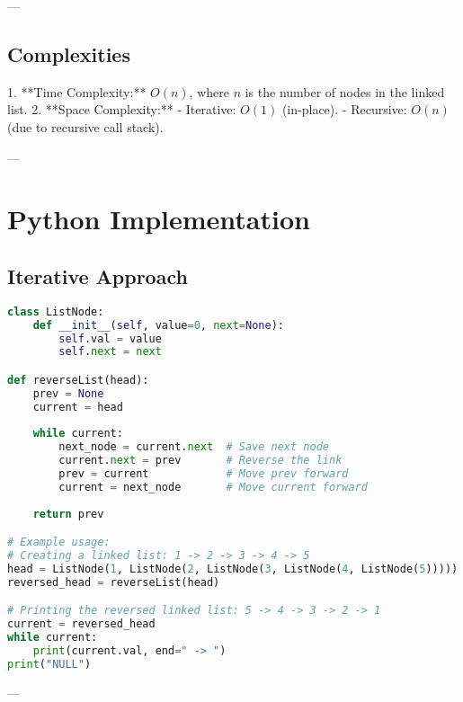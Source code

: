 ---

\subsection*{Complexities}
1. **Time Complexity:** \(O(n)\), where \(n\) is the number of nodes in the linked list.
2. **Space Complexity:**
   - Iterative: \(O(1)\) (in-place).
   - Recursive: \(O(n)\) (due to recursive call stack).

---

\section*{Python Implementation}

\subsection*{Iterative Approach}
\begin{fullwidth}
\begin{lstlisting}[language=Python]
class ListNode:
    def __init__(self, value=0, next=None):
        self.val = value
        self.next = next

def reverseList(head):
    prev = None
    current = head
    
    while current:
        next_node = current.next  # Save next node
        current.next = prev       # Reverse the link
        prev = current            # Move prev forward
        current = next_node       # Move current forward
    
    return prev

# Example usage:
# Creating a linked list: 1 -> 2 -> 3 -> 4 -> 5
head = ListNode(1, ListNode(2, ListNode(3, ListNode(4, ListNode(5)))))
reversed_head = reverseList(head)

# Printing the reversed linked list: 5 -> 4 -> 3 -> 2 -> 1
current = reversed_head
while current:
    print(current.val, end=" -> ")
print("NULL")
\end{lstlisting}
\end{fullwidth}

---


